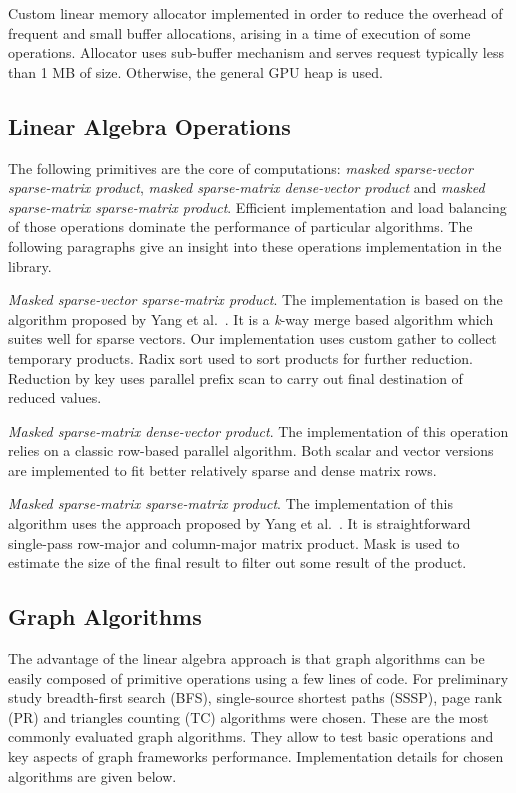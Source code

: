 Custom linear memory allocator implemented in order to reduce the overhead of frequent and small buffer allocations, arising in a time of execution of some operations. Allocator uses sub-buffer mechanism and serves request typically less than 1 MB of size. Otherwise, the general GPU heap is used.

\subsection{Linear Algebra Operations}

The following primitives are the core of computations: \textit{masked sparse-vector sparse-matrix product}, \textit{masked sparse-matrix dense-vector product} and \textit{masked sparse-matrix sparse-matrix product}. Efficient implementation and load balancing of those operations dominate the performance of particular algorithms. The following paragraphs give an insight into these operations implementation in the library.

\textit{Masked sparse-vector sparse-matrix product}. The implementation is based on the algorithm proposed by Yang et al.~\cite{7284398:spvspm}. It is a \textit{k}-way merge based algorithm which suites well for sparse vectors. Our implementation uses custom gather to collect temporary products. Radix sort used to sort products for further reduction. Reduction by key uses parallel prefix scan to carry out final destination of reduced values.

\textit{Masked sparse-matrix dense-vector product}. The implementation of this operation relies on a classic row-based parallel algorithm. Both scalar and vector versions are implemented to fit better relatively sparse and dense matrix rows. 

\textit{Masked sparse-matrix sparse-matrix product}. The implementation of this algorithm uses the approach proposed by Yang et al.~\cite{yang2019graphblast}. It is straightforward single-pass row-major and column-major matrix product. Mask is used to estimate the size of the final result to filter out some result of the product. 

\subsection{Graph Algorithms}

The advantage of the linear algebra approach is that graph algorithms can be easily composed of primitive operations using a few lines of code. For preliminary study breadth-first search (BFS), single-source shortest paths (SSSP), page rank (PR) and triangles counting (TC) algorithms were chosen. These are the most commonly evaluated graph algorithms. They allow to test basic operations and key aspects of graph frameworks performance. Implementation details for chosen algorithms are given below. 

